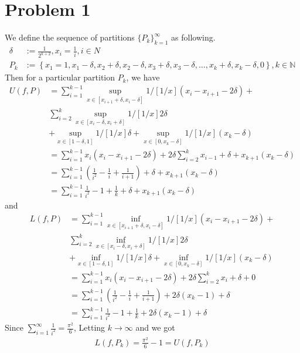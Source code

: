 \documentclass[a4paper]{report}
\begin{document}
\section*{Problem 1}
We define the sequence of partitions ${\{P_k\}}_{k=1}^\infty$ as following. 
\begin{align*}
    \delta &:= \frac{1}{2^{k+2}}, x_i = \frac{1}{i}, i \in N\\
    P_k &:= \left\{x_1=1, x_1-\delta, x_2+\delta, x_2-\delta,x_3+\delta,
    x_3-\delta,\ldots,x_k+\delta, x_k-\delta,0\right\},
    k \in \mathbb{N}
\end{align*}
Then for a particular partition $P_k$, we have 
\begin{align*}
    U(f, P) &= \sum_{i=1}^{k-1} \sup_{x\in [x_{i+1}+\delta, x_i-\delta]}1/[1/x]
            (x_i-x_{i+1} - 2\delta) + \\
        &\sum_{i=2}^k \sup_{x\in [x_i-\delta, x_i+\delta]} 1/[1/x]2\delta\\
        &+ \sup_{x\in [1-\delta,1]}1/[1/x]\delta
        + \sup_{x\in [0, x_k - \delta]}1/[1/x](x_k-\delta)\\
        &= \sum_{i=1}^{k-1} x_i (x_i-x_{i+1} - 2\delta)+2\delta\sum_{i=2}^k x_{i-1}+\delta
            +x_{k+1}(x_k-\delta) \\
        &= \sum_{i=1}^{k-1} \left(\frac{1}{i^2} -\frac{1}{i}+\frac{1}{i+1}\right)+\delta+
            x_{k+1}(x_k-\delta) \\
        &= \sum_{i=1}^{k-1} \frac{1}{i^2} - 1 + \frac{1}{k}+\delta+
        x_{k+1}(x_k-\delta)
\end{align*}
and
\begin{align*}
    L(f, P) &= \sum_{i=1}^{k-1} \inf_{x\in [x_{i+1}+\delta, x_i-\delta]}1/[1/x]
            (x_i-x_{i+1} - 2\delta) + \\
        &\sum_{i=2}^k \inf_{x\in [x_i-\delta, x_i+\delta]} 1/[1/x]2\delta\\
        &+ \inf_{x\in [1-\delta,1]}1/[1/x]\delta
        + \inf_{x\in [0, x_k - \delta]}1/[1/x](x_k-\delta)\\
        &= \sum_{i=1}^{k-1} x_i (x_i-x_{i+1} - 2\delta)+2\delta\sum_{i=2}^k x_i+\delta
            +0\\
        &= \sum_{i=1}^{k-1} \left(\frac{1}{i^2} -\frac{1}{i}+\frac{1}{i+1}\right)+2\delta
        (x_k-1)+\delta \\
        &= \sum_{i=1}^{k-1} \frac{1}{i^2}-1+\frac{1}{k}+2\delta(x_k-1) + \delta
\end{align*}
Since $\sum_{i=1}^\infty \frac{1}{i^2} = \frac{\pi^2}{6}$, Letting $k \to \infty$ and we got 
\begin{align*}
    L(f, P_k) = \frac{\pi^2}{6}-1= U(f, P_k)
\end{align*}
\end{document}
